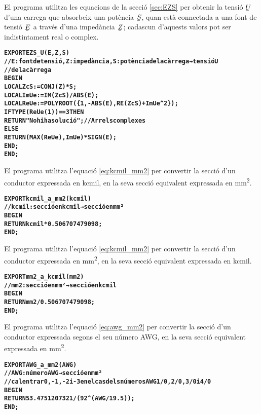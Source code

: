 El programa  utilitza les equacions de la secció \vref{sec:EZS} per obtenir la tensió $\cmplx{U}$ d'una carrega que absorbeix una potència $\cmplx{S}$, quan està connectada a una font de tensió $\cmplx{E}$ a través d'una impedància $\cmplx{Z}$; cadascun d'aquests valors pot ser indistintament real o complex.
\vspace{-1cm}
\begin{alltt}
\bfseries
{}
    EXPORT EZS_U(E,Z,S)
    // E:font de tensió, Z:impedància, S:potència de la càrrega → tensió U
    // de la càrrega
    BEGIN
      LOCAL ZcS:=CONJ(Z)*S;
      LOCAL ImUe:=IM(ZcS)/ABS(E);
      LOCAL ReUe:=POLYROOT(\{1,-ABS(E),RE(ZcS)+ImUe^2\});
      IF TYPE(ReUe(1))==3 THEN
        RETURN "No hi ha solució"; // Arrels complexes
      ELSE
        RETURN (MAX(ReUe),ImUe)*SIGN(E);
      END;
    END;
\end{alltt}


El programa  utilitza l'equació \eqref{eq:kcmil_mm2} per convertir la secció d'un conductor expressada en \si{kcmil}, en la seva secció equivalent expressada en \si{mm^2}.
\vspace{-1cm}
\begin{alltt}
\bfseries
{}
    EXPORT kcmil_a_mm2(kcmil)
    // kcmil:secció en kcmil → secció en mm²
    BEGIN
      RETURN kcmil*0.506707479098;
    END;
\end{alltt}

El programa  utilitza l'equació \eqref{eq:kcmil_mm2} per convertir la secció d'un conductor expressada en \si{mm^2}, en la seva secció equivalent expressada en \si{kcmil}.
\vspace{-1cm}
\begin{alltt}
\bfseries
{}
    EXPORT mm2_a_kcmil(mm2)
    // mm2:secció en mm² → secció en kcmil
    BEGIN
      RETURN mm2/0.506707479098;
    END;
\end{alltt}

El programa  utilitza l'equació \eqref{eq:awg_mm2} per convertir la secció d'un conductor expressada segons el seu número AWG, en la seva secció equivalent expressada en \si{mm^2}.
\vspace{-1cm}
\begin{alltt}
\bfseries
{}
    EXPORT AWG_a_mm2(AWG)
    // AWG:número AWG → secció en mm²
    // cal entrar 0, -1, -2 i -3 en el cas dels números AWG 1/0, 2/0, 3/0 i 4/0
    BEGIN
      RETURN 53.4751207321/(92^(AWG/19.5));
    END;
\end{alltt}

